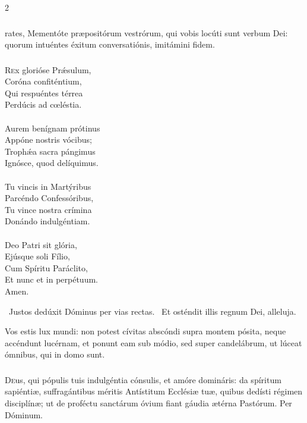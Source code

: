 \documentclass[9pt,twoside]{extarticle}
\begin{document}
\begin{multicols}{2}
\subsubsection*{}
rates, Mementóte præpositórum vestrórum, qui vobis locúti sunt verbum Dei: quorum intuéntes éxitum conversatiónis, imitámini fidem.

\subsubsection*{\center {}}
\lettrine{R}ex glorióse Prǽsulum,\\
Coróna confiténtium,\\
Qui respuéntes térrea\\
Perdúcis ad cœléstia.\\
\\
Aurem benígnam prótinus\\
Appóne nostris vócibus;\\
Trophǽa sacra pángimus\\
Ignósce, quod delíquimus.\\
\\
Tu vincis in Martýribus\\
Parcéndo Confessóribus,\\
Tu vince nostra crímina\\
Donándo indulgéntiam.\\
\\
Deo Patri sit glória,\\
Ejúsque soli Fílio,\\
Cum Spíritu Paráclito,\\
Et nunc et in perpétuum.\\
Amen.

\begin{tightlist}{}
\item {}~Justos dedúxit Dóminus per vias rectas. ~Et osténdit illis regnum Dei, alleluja.
\item {} Vos estis lux mundi: non potest cívitas abscóndi supra montem pósita, neque accéndunt lucérnam, et ponunt eam sub módio, sed super candelábrum, ut lúceat ómnibus, qui in domo sunt.
\end{tightlist}

\subsubsection*{\center {}}
\lettrine{D}eus, qui pópulis tuis indulgéntia cónsulis, et amóre domináris: da spíritum sapiéntiæ, suffragántibus méritis Antístitum Ecclésiæ tuæ, quibus dedísti régimen disciplínæ; ut de proféctu sanctárum óvium fiant gáudia ætérna Pastórum. Per Dóminum.


\end{multicols}
\end{document}
